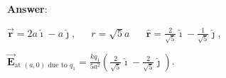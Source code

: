 \documentclass{article}
\newcommand{\ds}[0]{\displaystyle}
\newcommand{\ihat}[0]{\hat{\boldsymbol{\imath}}}
\newcommand{\jhat}[0]{\hat{\boldsymbol{\jmath}}}
\newcommand{\rhat}[0]{\hat{\mathbf{r}}}
\newcommand{\bfvec}[1]{\vec{\mathbf{#1}}}
\begin{document}


\ifsolutions
{\bf Answer}:

$\bfvec{r}=2a\ihat-a\jhat$,
$\quad$ $r=\sqrt{5}a$
$\quad$
$\ds\rhat=\frac{2}{\sqrt{5}}\ihat-\frac{1}{\sqrt{5}}\jhat$,

$\ds\bfvec{E}_{\text{at }(a,0) \text{ due to }q_1}=\frac{kq_1}{5a^2}\left(\frac{2}{\sqrt{5}}\ihat -\frac{2}{\sqrt{5}}\jhat\right)$.
\fi
\end{document}
